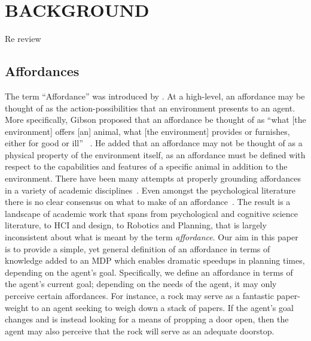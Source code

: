 \documentclass[]{article}
\begin{document}


\section{BACKGROUND}

Re review

\subsection{Affordances}

The term ``Affordance'' was introduced by \citet{gibson77}. At a
high-level, an affordance may be thought of as the
action-possibilities that an environment presents to an agent. More
specifically, Gibson proposed that an affordance be thought of as
``what [the environment] offers [an] animal, what [the environment]
provides or furnishes, either for good or ill'' ~\citep{gibson77}. He
added that an affordance may not be thought of as a physical property
of the environment itself, as an affordance must be defined with
respect to the capabilities and features of a specific animal in
addition to the environment.  There have been many attempts at
properly grounding affordances in a variety of academic
disciplines~\citep{1,2,3}. Even amongst the psychological literature
there is no clear consensus on what to make of an
affordance~\citep{oliverxx}.  The result is a landscape of academic
work that spans from psychological and cognitive science literature,
to HCI and design, to Robotics and Planning, that is largely
inconsistent about what is meant by the term {\it affordance}.  Our
aim in this paper is to provide a simple, yet general definition of an
affordance in terms of knowledge added to an MDP which enables
dramatic speedups in planning times, depending on the agent's goal.
Specifically, we define an affordance in terms of the agent's current
goal; depending on the needs of the agent, it may only perceive
certain affordances. For instance, a rock may serve as a fantastic
paper-weight to an agent seeking to weigh down a stack of papers. If
the agent's goal changes and is instead looking for a means of
propping a door open, then the agent may also perceive that the rock
will serve as an adequate doorstop.
\end{document}
